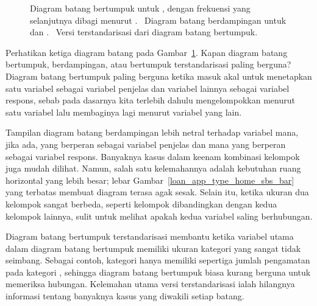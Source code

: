 \begin{figure}[h]
  \caption{ Diagram batang
      bertumpuk untuk ,
      dengan frekuensi yang selanjutnya dibagi menurut
      .
      ~Diagram batang
      berdampingan untuk 
      dan .
      ~Versi
      terstandarisasi dari diagram batang bertumpuk.}
  \label{loan_app_type_home_seg_bar_plot}
\end{figure}

\begin{examplewrap}
\begin{nexample}{Perhatikan ketiga diagram batang pada
    Gambar~\ref{loan_app_type_home_seg_bar_plot}.
    Kapan diagram batang bertumpuk, berdampingan, atau
    bertumpuk terstandarisasi paling berguna?}
  Diagram batang bertumpuk paling berguna ketika masuk akal
  untuk menetapkan satu variabel sebagai variabel penjelas
  dan variabel lainnya sebagai variabel respons, sebab pada dasarnya
  kita terlebih dahulu mengelompokkan menurut satu variabel lalu
  membaginya lagi menurut variabel yang lain.

  Tampilan diagram batang berdampingan lebih netral terhadap
  variabel mana, jika ada, yang berperan sebagai variabel penjelas
  dan mana yang berperan sebagai variabel respons.
  Banyaknya kasus dalam keenam kombinasi kelompok juga mudah dilihat.
  Namun, salah satu kelemahannya
  adalah kebutuhan ruang horizontal yang lebih besar;
  lebar Gambar~\ref{loan_app_type_home_sbs_bar}
  yang terbatas membuat diagram terasa agak sesak.
  Selain itu, ketika ukuran dua kelompok sangat berbeda,
  seperti kelompok  dibandingkan dengan
  kedua kelompok lainnya,
  sulit untuk melihat apakah kedua variabel saling berhubungan.

  Diagram batang bertumpuk terstandarisasi membantu ketika
  variabel utama dalam diagram batang bertumpuk memiliki ukuran
  kategori yang sangat tidak seimbang. Sebagai contoh,
  kategori  hanya memiliki sepertiga jumlah
  pengamatan pada kategori ,
  sehingga diagram batang bertumpuk biasa kurang berguna
  untuk memeriksa hubungan.
  Kelemahan utama versi terstandarisasi
  ialah hilangnya informasi tentang banyaknya kasus yang
  diwakili setiap batang.
\end{nexample}
\end{examplewrap}

